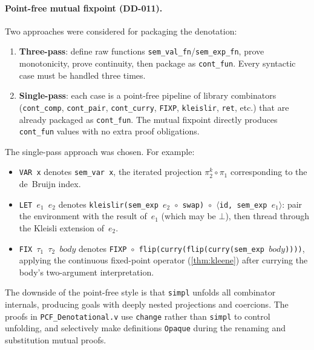 \paragraph{Point-free mutual fixpoint (DD-011).}
Two approaches were considered for packaging the denotation:

\begin{enumerate}
  \item \textbf{Three-pass}: define raw functions
    \texttt{sem\_val\_fn}/\texttt{sem\_exp\_fn}, prove monotonicity,
    prove continuity, then package as \texttt{cont\_fun}.  Every
    syntactic case must be handled three times.
  \item \textbf{Single-pass}: each case is a point-free pipeline of
    library combinators (\texttt{cont\_comp}, \texttt{cont\_pair},
    \texttt{cont\_curry}, \texttt{FIXP}, \texttt{kleislir},
    \texttt{ret}, etc.) that are already packaged as
    \texttt{cont\_fun}.  The mutual fixpoint directly produces
    \texttt{cont\_fun} values with no extra proof obligations.
\end{enumerate}

The single-pass approach was chosen.  For example:
\begin{itemize}
  \item \texttt{VAR~x} denotes \texttt{sem\_var~x}, the iterated
    projection $\pi_2^k \circ \pi_1$ corresponding to the de~Bruijn
    index.
  \item \texttt{LET~$e_1$~$e_2$} denotes
    \texttt{kleislir(sem\_exp~$e_2$~$\circ$~swap)~$\circ$~$\langle$id,
    sem\_exp~$e_1$$\rangle$}: pair the environment with the result
    of~$e_1$ (which may be $\bot$), then thread through the Kleisli
    extension of~$e_2$.
  \item \texttt{FIX~$\tau_1$~$\tau_2$~$\mathit{body}$} denotes
    \texttt{FIXP~$\circ$~flip(curry(flip(curry(sem\_exp~$\mathit{body}$))))},
    applying the continuous fixed-point operator
    (\cref{thm:kleene}) after currying the body's two-argument
    interpretation.
\end{itemize}

The downside of the point-free style is that \texttt{simpl} unfolds
all combinator internals, producing goals with deeply nested
projections and coercions.  The proofs in \texttt{PCF\_Denotational.v}
use \texttt{change} rather than \texttt{simpl} to control unfolding,
and selectively make definitions \texttt{Opaque} during the
renaming and substitution mutual proofs.

